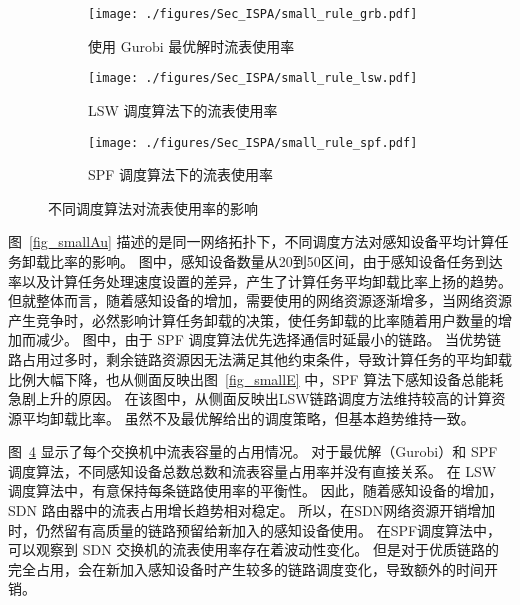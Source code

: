 \begin{figure}[!h]
  \centering
  \begin{subfigure}[h]{0.99\linewidth}
    \centering
    \texttt{[image: ./figures/Sec\_ISPA/small\_rule\_grb.pdf]}
    \label{fig_smallNetworkRG}
    \vspace{-0.5em}
    \caption{使用 Gurobi 最优解时流表使用率}
  \end{subfigure}
  \begin{subfigure}[h]{0.99\linewidth}
    \centering
    \texttt{[image: ./figures/Sec\_ISPA/small\_rule\_lsw.pdf]}
    \label{fig_smallNetworkRL}
    \vspace{-0.5em}
    \caption{LSW 调度算法下的流表使用率}
  \end{subfigure}
  \begin{subfigure}[h]{0.99\linewidth}
    \centering
    \texttt{[image: ./figures/Sec\_ISPA/small\_rule\_spf.pdf]}
    \label{fig_smallNetworkRS}
    \vspace{-0.5em}
    \caption{SPF 调度算法下的流表使用率}
  \end{subfigure}
  \vspace{-0.5em}
  \caption{不同调度算法对流表使用率的影响}
\label{fig_smallrule}
\end{figure}

图~\ref{fig_smallAu} 描述的是同一网络拓扑下，不同调度方法对感知设备平均计算任务卸载比率的影响。
图中，感知设备数量从20到50区间，由于感知设备任务到达率以及计算任务处理速度设置的差异，产生了计算任务平均卸载比率上扬的趋势。
但就整体而言，随着感知设备的增加，需要使用的网络资源逐渐增多，当网络资源产生竞争时，必然影响计算任务卸载的决策，使任务卸载的比率随着用户数量的增加而减少。
图中，由于 SPF 调度算法优先选择通信时延最小的链路。
当优势链路占用过多时，剩余链路资源因无法满足其他约束条件，导致计算任务的平均卸载比例大幅下降，也从侧面反映出图~\ref{fig_smallE} 中，SPF 算法下感知设备总能耗急剧上升的原因。
在该图中，从侧面反映出LSW链路调度方法维持较高的计算资源平均卸载比率。
虽然不及最优解给出的调度策略，但基本趋势维持一致。

图~\ref{fig_smallrule} 显示了每个交换机中流表容量的占用情况。
对于最优解（Gurobi）和 SPF 调度算法，不同感知设备总数总数和流表容量占用率并没有直接关系。
在 LSW 调度算法中，有意保持每条链路使用率的平衡性。
因此，随着感知设备的增加，SDN 路由器中的流表占用增长趋势相对稳定。
所以，在SDN网络资源开销增加时，仍然留有高质量的链路预留给新加入的感知设备使用。
在SPF调度算法中，可以观察到 SDN 交换机的流表使用率存在着波动性变化。
但是对于优质链路的完全占用，会在新加入感知设备时产生较多的链路调度变化，导致额外的时间开销。



